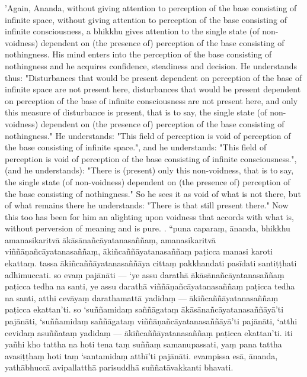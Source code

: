 \documentclass[11pt]{article}
\begin{document}
\begin{paracol}{2}
\begin{column}
\switchcolumn*
'Again, Ananda, without giving attention to perception of the base consisting of infinite space, without giving attention to perception of the base consisting of infinite consciousness, a bhikkhu gives attention to the single state (of non-voidness) dependent on (the presence of) perception of the base consisting of nothingness. His mind enters into the perception of the base consisting of nothingness and he acquires confidence, steadiness and decision. He understands thus: "Disturbances that would be present dependent on perception of the base of infinite space are not present here, disturbances that would be present dependent on perception of the base of infinite consciousness are not present here, and only this measure of disturbance is present, that is to say, the single state (of non-voidness) dependent on (the presence of) perception of the base consisting of nothingness." He understands: "This field of perception is void of perception of the base consisting of infinite space.", and he understands: "This field of perception is void of perception of the base consisting of infinite consciousness.", (and he understands): "There is (present) only this non-voidness, that is to say, the single state (of non-voidness) dependent on (the presence of) perception of the base consisting of nothingness." So he sees it as void of what is not there, but of what remains there he understands: "There is that still present there." Now this too has been for him an alighting upon voidness that accords with what is, without perversion of meaning and is pure.
. “puna caparaṃ, ānanda, bhikkhu amanasikaritvā ākāsānañcāyatanasaññaṃ, amanasikaritvā viññāṇañcāyatanasaññaṃ, ākiñcaññāyatanasaññaṃ paṭicca manasi karoti ekattaṃ. tassa ākiñcaññāyatanasaññāya cittaṃ pakkhandati pasīdati santiṭṭhati adhimuccati. so evaṃ pajānāti — ‘ye assu darathā ākāsānañcāyatanasaññaṃ paṭicca tedha na santi, ye assu darathā viññāṇañcāyatanasaññaṃ paṭicca tedha na santi, atthi cevāyaṃ darathamattā yadidaṃ — ākiñcaññāyatanasaññaṃ paṭicca ekattan’ti. so ‘suññamidaṃ saññāgataṃ ākāsānañcāyatanasaññāyā’ti pajānāti, ‘suññamidaṃ saññāgataṃ viññāṇañcāyatanasaññāyā’ti pajānāti, ‘atthi cevidaṃ asuññataṃ yadidaṃ — ākiñcaññāyatanasaññaṃ paṭicca ekattan’ti. iti yañhi kho tattha na hoti tena taṃ suññaṃ samanupassati, yaṃ pana tattha avasiṭṭhaṃ hoti taṃ ‘santamidaṃ atthī’ti pajānāti. evampissa esā, ānanda, yathābhuccā avipallatthā parisuddhā suññatāvakkanti bhavati.
\switchcolumn*

\end{column}
\end{paracol}
\end{document}
